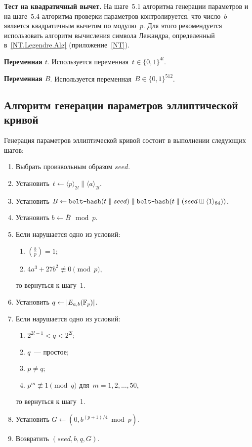 {\bf Тест на квадратичный вычет.}
На шаге~5.1 алгоритма генерации параметров и на шаге~5.4
алгоритма проверки параметров контролируется, 
что число~$b$ является квадратичным вычетом
по модулю~$p$.
%
Для этого рекомендуется
использовать алгоритм вычисления символа Лежандра,
определенный в~\ref{NT.Legendre.Alg}
(приложение~\ref{NT}).

{\bf Переменная $t$}.
Используется переменная~$t\in\{0,1\}^{4l}$.

{\bf Переменная $B$}.
Используется переменная~$B\in\{0,1\}^{512}$.

\subsection{Алгоритм генерации параметров эллиптической кривой}\label{GENEC}

Генерация параметров эллиптической кривой состоит в выполнении 
следующих шагов:
\begin{enumerate}
\item
Выбрать произвольным образом $seed$.

\item
Установить~$t\leftarrow \langle p\rangle_{2l}\parallel \langle a\rangle_{2l}$.

\item
Установить
$B\leftarrow 
\texttt{belt-hash}(t\parallel seed)
\parallel
\texttt{belt-hash}(t\parallel 
(seed\boxplus\langle 1\rangle_{64}))$.

\item
Установить $b\leftarrow \overline{B}\mod p$.

\item
Если нарушается одно из условий:
\begin{enumerate}
\item
$\left(\frac{b}{p}\right)=1$;
\item
$4a^3+27b^2\not\equiv 0\pmod{p}$,
\end{enumerate}
то вернуться к шагу~1.

\item
Установить $q\leftarrow |E_{a,b}(\mathbb{F}_p)|$.

\item
Если нарушается одно из условий:
\begin{enumerate}
\item
$2^{2l-1}<q<2^{2l}$;
\item
$q$~--- простое;
\item
$p\neq q$;
\item
$p^m\not\equiv 1\pmod{q}$ для~$m=1,2,\ldots,50$,
\end{enumerate}
то вернуться к шагу~1.

\item
Установить $G\leftarrow (0,b^{(p+1)/4}\bmod p)$.

\item
Возвратить $(seed,b,q,G)$.
\end{enumerate}

